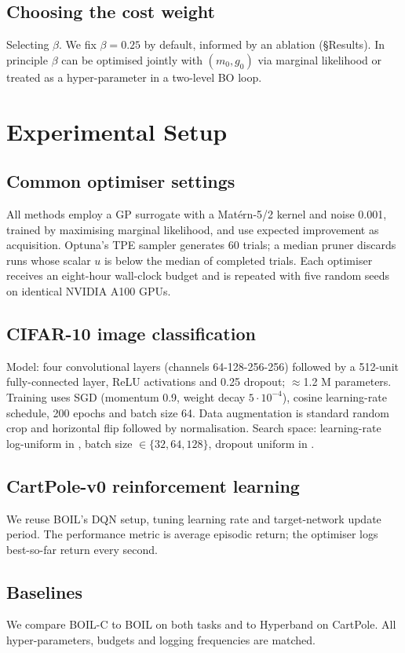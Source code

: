 \documentclass{article} %
\begin{document}
\subsection{Choosing the cost weight}
Selecting \(\beta\). We fix \(\beta=0.25\) by default, informed by an ablation (\S Results). In principle \(\beta\) can be optimised jointly with \((m_0,g_0)\) via marginal likelihood or treated as a hyper-parameter in a two-level BO loop.

\section{Experimental Setup}
\label{sec:experimental}
\subsection{Common optimiser settings}
All methods employ a GP surrogate with a Mat\'ern-5/2 kernel and noise 0.001, trained by maximising marginal likelihood, and use expected improvement as acquisition. Optuna's TPE sampler generates 60 trials; a median pruner discards runs whose scalar \(u\) is below the median of completed trials. Each optimiser receives an eight-hour wall-clock budget and is repeated with five random seeds on identical NVIDIA A100 GPUs.

\subsection{CIFAR-10 image classification}
Model: four convolutional layers (channels 64-128-256-256) followed by a 512-unit fully-connected layer, ReLU activations and 0.25 dropout; \(\approx\)1.2 M parameters. Training uses SGD (momentum 0.9, weight decay \(5 \cdot 10^{-4}\)), cosine learning-rate schedule, 200 epochs and batch size 64. Data augmentation is standard random crop and horizontal flip followed by normalisation. Search space: learning-rate log-uniform in , batch size \(\in\{32,64,128\}\), dropout uniform in .

\subsection{CartPole-v0 reinforcement learning}
We reuse BOIL's DQN setup, tuning learning rate and target-network update period. The performance metric is average episodic return; the optimiser logs best-so-far return every second.

\subsection{Baselines}
We compare BOIL-C to BOIL on both tasks and to Hyperband on CartPole. All hyper-parameters, budgets and logging frequencies are matched.
\end{document}
